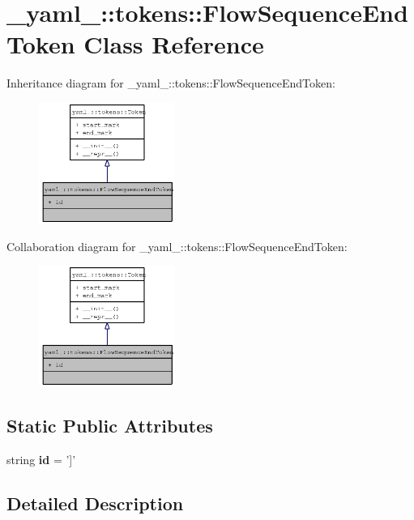 \section{\_\-yaml\_\-::tokens::FlowSequenceEndToken Class Reference}
\label{class__yaml___1_1tokens_1_1FlowSequenceEndToken}
Inheritance diagram for \_\-yaml\_\-::tokens::FlowSequenceEndToken:\nopagebreak
\begin{figure}[H]
\begin{center}
\leavevmode
\includegraphics[width=126pt]{class__yaml___1_1tokens_1_1FlowSequenceEndToken__inherit__graph}
\end{center}
\end{figure}
Collaboration diagram for \_\-yaml\_\-::tokens::FlowSequenceEndToken:\nopagebreak
\begin{figure}[H]
\begin{center}
\leavevmode
\includegraphics[width=126pt]{class__yaml___1_1tokens_1_1FlowSequenceEndToken__coll__graph}
\end{center}
\end{figure}
\subsection*{Static Public Attributes}
\begin{CompactItemize}
\item 
string {\bf id} = ']'
\end{CompactItemize}


\subsection{Detailed Description}


